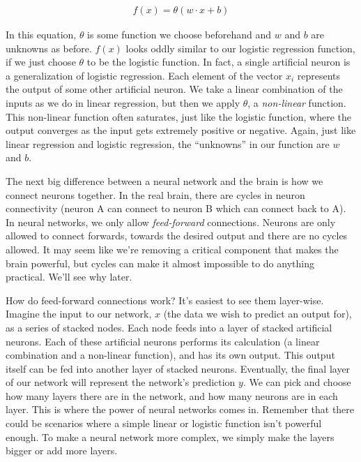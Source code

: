 \documentclass[a4paper,10pt]{article}
\begin{document}
\begin{align*}
  f(x) = \theta(w \cdot x + b)
\end{align*}

In this equation, $\theta$
is some function we choose beforehand
and $w$ and $b$ are unknowns as before.
$f(x)$ looks oddly similar to our
logistic regression function,
if we just choose $\theta$ 
to be the logistic function.
In fact, a single artificial neuron
is a generalization of logistic regression.
Each element of the vector $x_i$
represents the output of some
other artificial neuron.
We take a linear combination of the inputs
as we do in linear regression, but then we apply
$\theta$, a \emph{non-linear} function.
This non-linear function often saturates,
just like the logistic function,
where the output converges as
the input gets extremely positive or negative.
Again, just like linear regression and
logistic regression, the ``unknowns''
in our function are $w$ and $b$.


The next big difference between
a neural network and the brain
is how we connect neurons together.
In the real brain,
there are cycles in neuron connectivity
(neuron A can connect to neuron B which
can connect back to A). In
neural networks, we only allow
\emph{feed-forward} connections.
Neurons are only allowed to connect
forwards, towards the desired output
and there are no cycles allowed.
It may seem like we're removing
a critical component that makes the brain powerful,
but cycles can make it almost impossible
to do anything practical. We'll see why later.

How do feed-forward connections work?
It's easiest to see them layer-wise.
Imagine the input to our network, $x$ (the data
we wish to predict an output for),
as a series of stacked nodes.
Each node feeds into a layer of stacked artificial neurons.
Each of these artificial neurons performs its calculation (a linear combination
and a non-linear function), and has its own output.
This output itself can be fed into another layer of
stacked neurons. Eventually, the final layer of our network
will represent the network's prediction $y$.
We can pick and choose how many layers
there are in the network, and how many neurons
are in each layer. This is where
the power of neural networks comes in. Remember
that there could be scenarios where
a simple linear or logistic function isn't
powerful enough. To make a neural network
more complex, we simply make the layers
bigger or add more layers.
\end{document}
